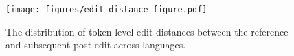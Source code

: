 \begin{figure}
    \centering
    \texttt{[image: figures/edit\_distance\_figure.pdf]}
    \caption{The distribution of token-level edit distances between the reference and subsequent post-edit across languages.}
    \label{fig:edit_distance}
\end{figure}